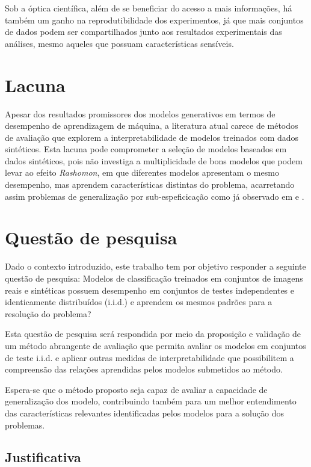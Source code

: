 Sob a óptica científica, além de se beneficiar do acesso a mais informações, há também um ganho na reprodutibilidade dos experimentos, já que mais conjuntos de dados podem ser compartilhados junto aos resultados experimentais das análises, mesmo aqueles que possuam características sensíveis.


\section{Lacuna}

Apesar dos resultados promissores dos modelos generativos em termos de desempenho de aprendizagem de máquina, a literatura atual carece de métodos de avaliação que explorem a interpretabilidade de modelos treinados com dados sintéticos. Esta lacuna pode comprometer a seleção de modelos baseados em dados sintéticos, pois não investiga a multiplicidade de bons modelos que podem levar ao efeito \textit{Rashomon}, em que diferentes modelos apresentam o mesmo desempenho, mas aprendem características distintas do problema, acarretando assim problemas de generalização por sub-espeficicação como já observado em  e .


\section{Questão de pesquisa}

Dado o contexto introduzido, este trabalho tem por objetivo responder a seguinte questão de pesquisa: Modelos de classificação treinados em conjuntos de imagens reais e sintéticas possuem desempenho em conjuntos de testes independentes e identicamente distribuídos (i.i.d.) e aprendem os mesmos padrões para a resolução do problema?

Esta questão de pesquisa será respondida por meio da proposição e validação de um método abrangente de avaliação que permita avaliar os modelos em conjuntos de teste i.i.d. e aplicar outras medidas de interpretabilidade que possibilitem a compreensão das relações aprendidas pelos modelos submetidos ao método.

Espera-se que o método proposto seja capaz de avaliar a capacidade de generalização dos modelo, contribuindo também para um melhor entendimento das características relevantes identificadas pelos modelos para a solução dos problemas.

\subsection{Justificativa}

